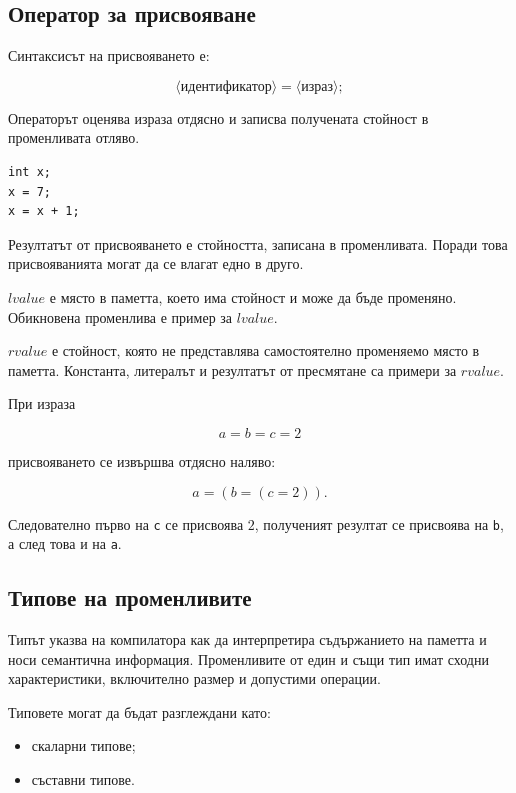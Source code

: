 \subsection{Оператор за присвояване}\label{s:14.5.2}

Синтаксисът на присвояването е:

\[
\langle\text{идентификатор}\rangle
=
\langle\text{израз}\rangle;
\]

Операторът оценява израза отдясно и записва получената стойност в променливата отляво.

\begin{verbatim}
int x;
x = 7;
x = x + 1;
\end{verbatim}

Резултатът от присвояването е стойността, записана в променливата. Поради това присвояванията могат да се влагат едно в друго.

\begin{defn}
$lvalue$ е място в паметта, което има стойност и може да бъде променяно. Обикновена променлива е пример за $lvalue$.

$rvalue$ е стойност, която не представлява самостоятелно променяемо място в паметта. Константа, литералът и резултатът от пресмятане са примери за $rvalue$.
\end{defn}

При израза

\[
a=b=c=2
\]

присвояването се извършва отдясно наляво:

\[
a=(b=(c=2)).
\]

Следователно първо на \texttt{c} се присвоява $2$, полученият резултат се присвоява на \texttt{b}, а след това и на \texttt{a}.

\subsection{Типове на променливите}\label{s:14.5.3}

Типът указва на компилатора как да интерпретира съдържанието на паметта и носи семантична информация. Променливите от един и същи тип имат сходни характеристики, включително размер и допустими операции.

Типовете могат да бъдат разглеждани като:

\begin{itemize}
\item скаларни типове;
\item съставни типове.
\end{itemize}

